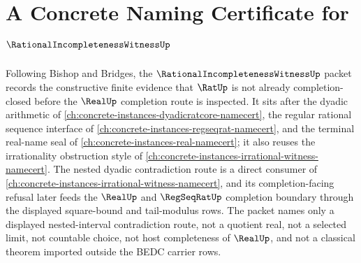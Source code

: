 \chapter{A Concrete Naming Certificate for $\RationalIncompletenessWitnessUp$}
\label{ch:concrete-instances-rational-incompleteness-witness-namecert}

Following Bishop and Bridges, the $\RationalIncompletenessWitnessUp$ packet records the constructive finite evidence that $\RatUp$ is not already completion-closed before the $\RealUp$ completion route is inspected. It sits after the dyadic arithmetic of \autoref{ch:concrete-instances-dyadicratcore-namecert}, the regular rational sequence interface of \autoref{ch:concrete-instances-regseqrat-namecert}, and the terminal real-name seal of \autoref{ch:concrete-instances-real-namecert}; it also reuses the irrationality obstruction style of \autoref{ch:concrete-instances-irrational-witness-namecert}. The nested dyadic contradiction route is a direct consumer of \autoref{ch:concrete-instances-irrational-witness-namecert}, and its completion-facing refusal later feeds the $\RealUp$ and $\RegSeqRatUp$ completion boundary through the displayed square-bound and tail-modulus rows. The packet names only a displayed nested-interval contradiction route, not a quotient real, not a selected limit, not countable choice, not host completeness of $\RealUp$, and not a classical theorem imported outside the BEDC carrier rows.

